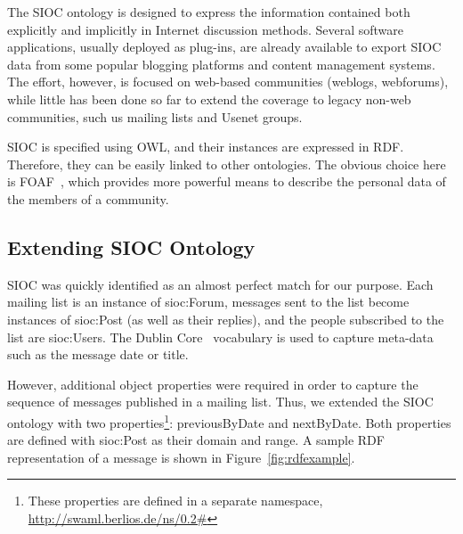 \documentclass{llncs}
\begin{document}

The SIOC ontology is designed to express the information contained
both explicitly  and implicitly in Internet discussion methods. Several 
software applications, usually deployed as plug-ins, are already available 
to export SIOC data from some popular blogging platforms and content 
management systems. The effort, however, is focused on web-based communities 
(weblogs, webforums), while little has been done so far to extend the coverage 
to legacy non-web communities, such us mailing lists and Usenet groups.

SIOC is specified using OWL, and their instances are expressed
in RDF. Therefore, they can be easily linked to other ontologies.
The obvious choice here is FOAF~\cite{FOAF}, which provides more
powerful means to describe the personal data of the members of
a community.

\subsection{Extending SIOC Ontology}

SIOC was quickly identified as an almost perfect match for our
purpose. Each mailing list is an instance of \textsf{sioc:Forum},
messages sent to the list become instances of \textsf{sioc:Post}
(as well as their replies), and the people subscribed to the
list are \textsf{sioc:User}s. The Dublin Core~\cite{DublinCore}
vocabulary is used to capture meta-data such as the message
date or title.

However, additional object properties were required
in order to capture the sequence of messages published in a
mailing list. Thus, we extended the SIOC ontology with two
properties\footnote{These properties are defined in a separate
namespace, \url{http://swaml.berlios.de/ns/0.2\#}}:
\textsf{previousByDate} and \textsf{nextByDate}. Both properties
are defined with \textsf{sioc:Post} as their domain and range.
A sample RDF representation of a message is shown in
Figure~\ref{fig:rdfexample}.
\end{document}
